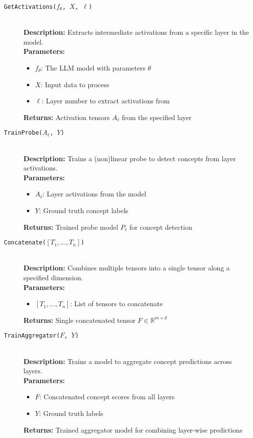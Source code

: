 \begin{description}
\item[\texttt{GetActivations($f_\theta$, $X$, $\ell$)}] \hfill \\
\textbf{Description:} Extracts intermediate activations from a specific layer in the model. \\
\textbf{Parameters:}
\begin{itemize}
\item $f_\theta$: The LLM model with parameters $\theta$
\item $X$: Input data to process
\item $\ell$: Layer number to extract activations from
\end{itemize}
\textbf{Returns:} Activation tensors $A_\ell$ from the specified layer
\item[\texttt{TrainProbe($A_\ell$, $Y$)}] \hfill \\
\textbf{Description:} Trains a (non)linear probe to detect concepts from layer activations. \\
\textbf{Parameters:}
\begin{itemize}
\item $A_\ell$: Layer activations from the model
\item $Y$: Ground truth concept labels
\end{itemize}
\textbf{Returns:} Trained probe model $P_\ell$ for concept detection
\item[\texttt{Concatenate($[T_1,\ldots,T_n]$)}] \hfill \\
\textbf{Description:} Combines multiple tensors into a single tensor along a specified dimension. \\
\textbf{Parameters:}
\begin{itemize}
\item $[T_1,\ldots,T_n]$: List of tensors to concatenate
\end{itemize}
\textbf{Returns:} Single concatenated tensor $F \in \mathbb{R}^{m \times d}$
\item[\texttt{TrainAggregator($F$, $Y$)}] \hfill \\
\textbf{Description:} Trains a model to aggregate concept predictions across layers. \\
\textbf{Parameters:}
\begin{itemize}
\item $F$: Concatenated concept scores from all layers
\item $Y$: Ground truth labels
\end{itemize}
\textbf{Returns:} Trained aggregator model for combining layer-wise predictions
\end{description}

